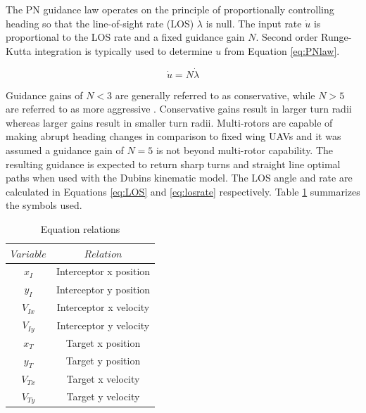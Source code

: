 \documentclass[conference]{IEEEtran}
\begin{document}
The PN guidance law operates on the principle of proportionally controlling heading so that the line-of-sight rate (LOS) $\dot{\lambda}$ is null. The input rate $\dot{u}$ is proportional to the LOS rate and a fixed guidance gain $N$. Second order Runge-Kutta integration is typically used to determine $u$ from Equation \ref{eq:PNlaw}.

\begin{equation} \label{eq:PNlaw}
\dot{u} = N\dot{\lambda}
\end{equation}


Guidance gains of $N < 3$ are generally referred to as conservative, while $N > 5$ are referred to as more aggressive \cite{zarchan}. Conservative gains result in larger turn radii whereas larger gains result in smaller turn radii. Multi-rotors are capable of making abrupt heading changes in comparison to fixed wing UAVs and it was assumed a guidance gain of $N = 5$ is not beyond multi-rotor capability. The resulting guidance is expected to return sharp turns and straight line optimal paths when used with the Dubins kinematic model. The LOS angle and rate are calculated in Equations \ref{eq:LOS} and \ref{eq:losrate} respectively. Table \ref{relations} summarizes the symbols used.
 
 \begin{table}
 \centering
 \caption{Equation relations}
 \begin{tabular}{cc}
 	\label{relations}

 	$Variable$ & $Relation$ \\
 	\hline 
 	$x_I$  & Interceptor x position \\ 
 	
 	$y_I$ & Interceptor y position \\ 
 	
 	$V_{Ix}$ & Interceptor x velocity \\ 
 	
 	$V_{Iy}$ & Interceptor y velocity \\ 
 	
 	$x_T$ & Target x position \\ 
 	
 	$y_T$ & Target y position \\ 
 	
 	$V_{Tx}$ & Target x velocity \\ 
 	
 	$V_{Ty}$ & Target y velocity \\ 

 \end{tabular}
 \end{table}
\end{document}
